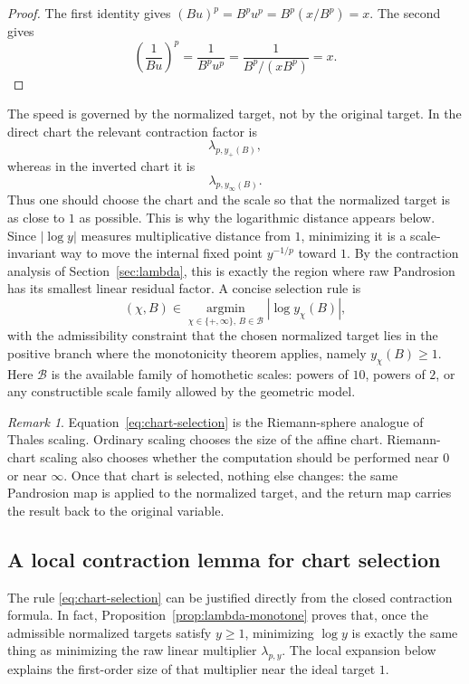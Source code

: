 \documentclass[10pt,a4paper]{article}
\theoremstyle{plain}
\theoremstyle{definition}
\theoremstyle{remark}
\newtheorem{remark}[theorem]{Remark}
\begin{document}
\begin{proof}
The first identity gives $(Bu)^p=B^p u^p=B^p(x/B^p)=x$.  The second gives
\[
  \left(\frac{1}{Bu}\right)^p
  =\frac{1}{B^p u^p}
  =\frac{1}{B^p/(xB^p)}=x.
\]
\end{proof}

The speed is governed by the normalized target, not by the original target.  In
the direct chart the relevant contraction factor is
\[
  \lambda_{p,y_+(B)},
\]
whereas in the inverted chart it is
\[
  \lambda_{p,y_\infty(B)}.
\]
Thus one should choose the chart and the scale so that the normalized target is
as close to $1$ as possible.  This is why the logarithmic distance appears
below.  Since $|\log y|$ measures multiplicative distance from $1$, minimizing
it is a scale-invariant way to move the internal fixed point
$y^{-1/p}$ toward $1$.  By the contraction analysis of
Section~\ref{sec:lambda}, this is exactly the region where raw Pandrosion has
its smallest linear residual factor.  A concise selection rule is
\begin{equation}
  (\chi,B)\in
  \operatorname*{argmin}_{\chi\in\{+,\infty\},\,B\in\mathcal B}
  \left|\log y_\chi(B)\right|,
  \label{eq:chart-selection}
\end{equation}
with the admissibility constraint that the chosen normalized target lies in the
positive branch where the monotonicity theorem applies, namely $y_\chi(B)\ge 1$.
Here $\mathcal B$ is
the available family of homothetic scales: powers of $10$, powers of $2$, or
any constructible scale family allowed by the geometric model.

\begin{remark}
Equation~\eqref{eq:chart-selection} is the Riemann-sphere analogue of Thales
scaling.  Ordinary scaling chooses the size of the affine chart.  Riemann-chart
scaling also chooses whether the computation should be performed near $0$ or
near $\infty$.  Once that chart is selected, nothing else changes: the same
Pandrosion map is applied to the normalized target, and the return map carries
the result back to the original variable.
\end{remark}


\subsection{A local contraction lemma for chart selection}
\label{subsec:chart-contraction-lemma}

The rule \eqref{eq:chart-selection} can be justified directly from the closed
contraction formula.  In fact, Proposition~\ref{prop:lambda-monotone} proves
that, once the admissible normalized targets satisfy $y\ge1$, minimizing
$\log y$ is exactly the same thing as minimizing the raw linear multiplier
$\lambda_{p,y}$.  The local expansion below explains the first-order size of
that multiplier near the ideal target $1$.
\end{document}
